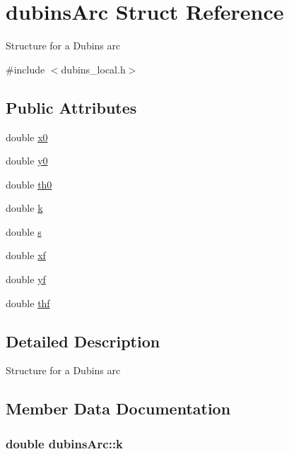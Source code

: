 \hypertarget{structdubinsArc}{}\section{dubins\+Arc Struct Reference}
\label{structdubinsArc}


Structure for a Dubins arc  




{\ttfamily \#include $<$dubins\+\_\+local.\+h$>$}

\subsection*{Public Attributes}
\begin{DoxyCompactItemize}
\item 
double \hyperlink{structdubinsArc_a120eba56ab37025c4de0835b90a3faf2}{x0}
\item 
double \hyperlink{structdubinsArc_ae05a57a66703e9993a68c23160a7b54a}{y0}
\item 
double \hyperlink{structdubinsArc_a51bb953226e122a68b132cd4c7d4a198}{th0}
\item 
double \hyperlink{structdubinsArc_ae3556ac95899f6a96dcb728a864c74b3}{k}
\item 
double \hyperlink{structdubinsArc_a5fe3bc6759fc84ee91d254c84015d34d}{s}
\item 
double \hyperlink{structdubinsArc_a5bad303217c1f05eb0feb97d9b636528}{xf}
\item 
double \hyperlink{structdubinsArc_a782cb717a7d9ab1836d3fae17073f104}{yf}
\item 
double \hyperlink{structdubinsArc_aca32bb174d947ee2e38fc00dda92bc63}{thf}
\end{DoxyCompactItemize}


\subsection{Detailed Description}
Structure for a Dubins arc 

\subsection{Member Data Documentation}
\subsubsection[{\texorpdfstring{k}{k}}]{\setlength{\rightskip}{0pt plus 5cm}double dubins\+Arc\+::k}\hypertarget{structdubinsArc_ae3556ac95899f6a96dcb728a864c74b3}{}\label{structdubinsArc_ae3556ac95899f6a96dcb728a864c74b3}
